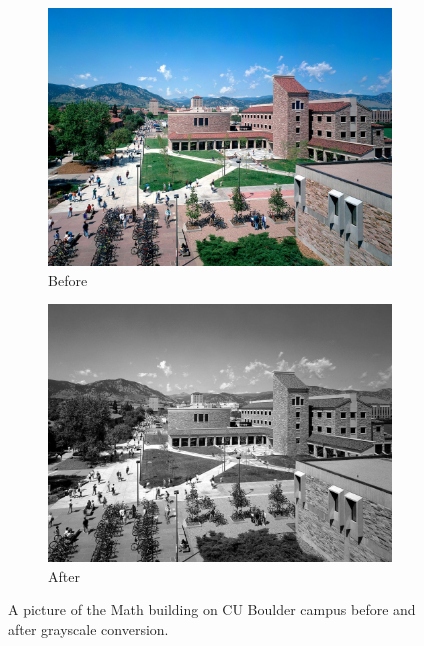 \documentclass[11pt,a4paper]{article}
\begin{document}
\begin{figure}[ht]
	\centering
	\begin{subfigure}[h]{0.45\textwidth}
		\includegraphics[width=\textwidth]{images/test01}
		\caption{Before}
		\label{fig:gray1_bef}
	\end{subfigure}
	\begin{subfigure}[h]{0.45\textwidth}
		\includegraphics[width=\textwidth]{figs/test01_gray}
		\caption{After}
		\label{fig:gray1_aft}
	\end{subfigure}
	\caption{A picture of the Math building on CU Boulder campus before and after grayscale conversion.}
	\label{fig:gray1}
\end{figure}
\end{document}
